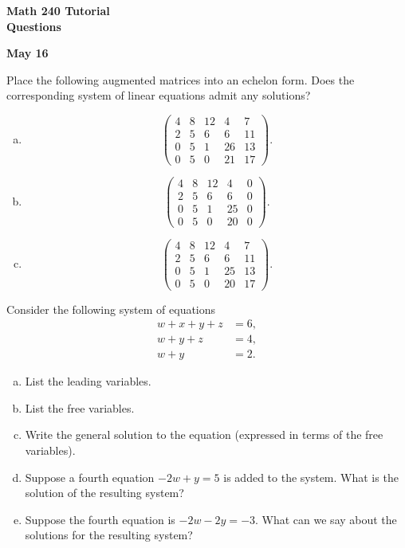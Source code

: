\documentclass[a4paper,11pt]{article}
\begin{document}
\begin{center}
  {\Large\bfseries Math 240 Tutorial \\ Questions}
\end{center}
\begin{center}
  {\bfseries May 16}
\end{center}

 Place the following augmented matrices into
an echelon form. Does the corresponding system of linear equations admit any
solutions?
\begin{enumerate}[(a)]
\item
  \[
    \left(
      \begin{array}{cccc|c}
        4 & 8 & 12 & 4 & 7 \\
        2 & 5 & 6 & 6 & 11 \\
        0 & 5 & 1 & 26 & 13 \\
        0 & 5 & 0 & 21 & 17
      \end{array}
    \right).
  \]
\item
  \[
    \left(
      \begin{array}{cccc|c}
        4 & 8 & 12 & 4 & 0 \\
        2 & 5 & 6 & 6 & 0 \\
        0 & 5 & 1 & 25 & 0 \\
        0 & 5 & 0 & 20 & 0       
      \end{array}
    \right).
  \]
\item
  \[
    \left(
      \begin{array}{cccc|c}
        4 & 8 & 12 & 4 & 7 \\
        2 & 5 & 6 & 6 & 11 \\
        0 & 5 & 1 & 25 & 13 \\
        0 & 5 & 0 & 20 & 17       
      \end{array}
    \right).
  \]
\end{enumerate}

 Consider the following system of equations
\begin{align*}
  w + x + y + z &= 6, \\
  w + y + z &= 4, \\
  w + y &=2.
\end{align*}
\begin{enumerate}[(a)]
\item List the leading variables.
\item List the free variables.
\item Write the general solution to the equation (expressed in terms of the free
  variables).
\item Suppose a fourth equation $-2w+y=5$ is added to the system. What is the
  solution of the resulting system?
\item Suppose the fourth equation is $-2w-2y=-3$. What can we say about the
  solutions for the resulting system? \\
\end{enumerate}
\end{document}
